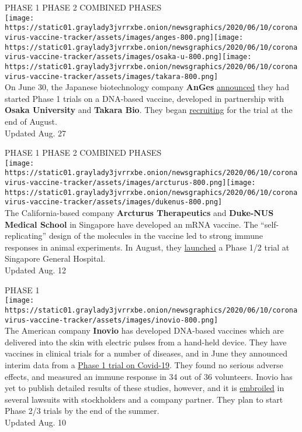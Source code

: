 PHASE 1 PHASE 2 COMBINED PHASES\\
\texttt{[image: https://static01.graylady3jvrrxbe.onion/newsgraphics/2020/06/10/coronavirus-vaccine-tracker/assets/images/anges-800.png]}\texttt{[image: https://static01.graylady3jvrrxbe.onion/newsgraphics/2020/06/10/coronavirus-vaccine-tracker/assets/images/osaka-u-800.png]}\texttt{[image: https://static01.graylady3jvrrxbe.onion/newsgraphics/2020/06/10/coronavirus-vaccine-tracker/assets/images/takara-800.png]}\\
On June 30, the Japanese biotechnology company \textbf{AnGes}
\href{https://www.japantimes.co.jp/news/2020/06/30/national/science-health/japan-first-coronavirus-vaccine-clinical-test-starts/}{announced}
they had started Phase 1 trials on a DNA-based vaccine, developed in
partnership with \textbf{Osaka University} and \textbf{Takara Bio}. They
began
\href{https://clinicaltrials.gov/ct2/show/NCT04527081?term=vaccine\&recrs=adf\&cond=COVID-19\&phase=0123\&sort=nwst\&draw=2\&rank=1}{recruiting}
for the trial at the end of August.\\
Updated Aug. 27

PHASE 1 PHASE 2 COMBINED PHASES\\
\texttt{[image: https://static01.graylady3jvrrxbe.onion/newsgraphics/2020/06/10/coronavirus-vaccine-tracker/assets/images/arcturus-800.png]}\texttt{[image: https://static01.graylady3jvrrxbe.onion/newsgraphics/2020/06/10/coronavirus-vaccine-tracker/assets/images/dukenus-800.png]}\\
The California-based company \textbf{Arcturus Therapeutics} and
\textbf{Duke-NUS Medical School} in Singapore have developed an mRNA
vaccine. The ``self-replicating'' design of the molecules in the vaccine
led to strong immune responses in animal experiments. In August, they
\href{https://ir.arcturusrx.com/news-releases/news-release-details/arcturus-therapeutics-announces-it-has-initiated-dosing-its}{launched}
a Phase 1/2 trial at Singapore General Hospital.\\
Updated Aug. 12

PHASE 1\\
\texttt{[image: https://static01.graylady3jvrrxbe.onion/newsgraphics/2020/06/10/coronavirus-vaccine-tracker/assets/images/inovio-800.png]}\\
The American company \textbf{Inovio} has developed DNA-based vaccines
which are delivered into the skin with electric pulses from a hand-held
device. They have vaccines in clinical trials for a number of diseases,
and in June they announced interim data from a
\href{https://www.nytimes3xbfgragh.onion/2020/06/13/science/vaccine-coronavirus-inovio.html}{Phase
1 trial on Covid-19}. They found no serious adverse effects, and
measured an immune response in 34 out of 36 volunteers. Inovio has yet
to publish detailed results of these studies, however, and it is
\href{https://www.nytimes3xbfgragh.onion/2020/08/09/business/coronavirus-vaccine-inovio.html}{embroiled}
in several lawsuits with stockholders and a company partner. They plan
to start Phase 2/3 trials by the end of the summer.\\
Updated Aug. 10

